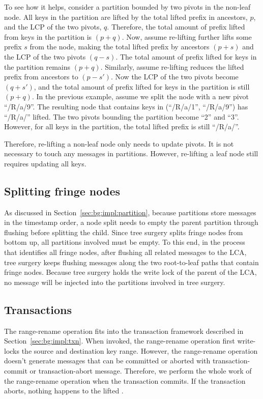 To see how it helps, consider a partition bounded by two pivots in the non-leaf
node.
All keys in the partition are lifted by the total lifted prefix in ancestors, $p$,
and the LCP of the two pivots, $q$.
Therefore, the total amount of prefix lifted from keys in the partition is $(p+q)$.
Now, assume re-lifting further lifts some prefix $s$ from the node,
making the total lifted prefix by ancestors $(p+s)$
and the LCP of the two pivots $(q-s)$.
The total amount of prefix lifted for keys in the partition remains $(p+q)$.
Similarly, assume re-lifting reduces the lifted prefix from ancestors to
$(p-s')$.
Now the LCP of the two pivots become $(q+s')$, and the total amount of prefix
lifted for keys in the partition is still $(p+q)$.
In the previous example, assume we split the node with a new pivot ``/R/a/9''.
The resulting node that contains keys in (``/R/a/1'', ``/R/a/9'') has ``/R/a/'' lifted.
The two pivots bounding the partition become ``2'' and ``3''.
However, for all keys in the partition, the total lifted prefix is still
``/R/a/''.

Therefore, re-lifting a non-leaf node only needs to update pivots.
It is not necessary to touch any messages in partitions.
However, re-lifting a leaf node still requires updating all keys.

\subsection{Splitting fringe nodes}

As discussed in Section~\ref{sec:bg:impl:partition},
because partitions store messages in the timestamp order,
a node split needs to empty the parent partition through flushing
before splitting the child.
Since tree surgery splits fringe nodes from bottom up,
all partitions involved must be empty.
To this end, in the process that identifies all fringe nodes,
after flushing all related messages to the LCA,
tree surgery keeps flushing messages along the two root-to-leaf paths
that contain fringe nodes.
Because tree surgery holds the write lock of the parent of the LCA,
no message will be injected into the partitions involved in tree surgery.

\subsection{Transactions}

The range-rename operation fits into the transaction framework described in
Section~\ref{sec:bg:impl:txn}.
When invoked, the range-rename operation first write-locks the source and
destination key range.
However, the range-rename operation doesn't generate messages that can
be committed or aborted with transaction-commit or transaction-abort message.
Therefore, we perform the whole work of the range-rename operation when the
transaction commits.
If the transaction aborts, nothing happens to the lifted \bet.


